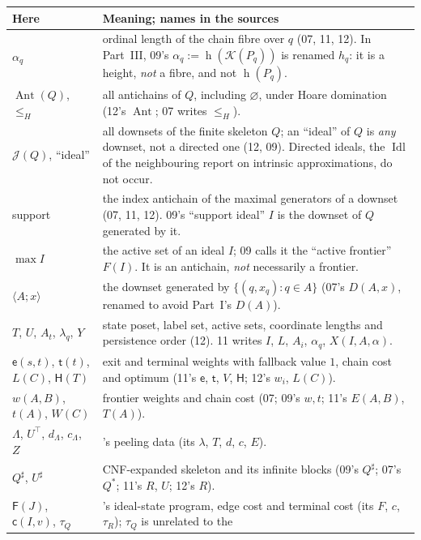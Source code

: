 \documentclass[11pt,a4paper]{article}
\theoremstyle{definition}
\theoremstyle{remark}
\newcommand{\K}{\mathcal K}
\newcommand{\hgt}{\operatorname{h}}
\newcommand{\J}{\mathcal J}
\newcommand{\Ant}{\operatorname{Ant}}
\newcommand{\ew}{\mathsf e}
\newcommand{\tw}{\mathsf t}
\newcommand{\HH}{\mathsf H}
\newcommand{\Fdp}{\mathsf F}
\begin{document}
\begin{table}[htbp]
\centering\small
\renewcommand{\arraystretch}{1.16}
\begin{tabularx}{\linewidth}{@{}>{\raggedright\arraybackslash}p{.27\linewidth}>{\raggedright\arraybackslash}X@{}}
\toprule
Here & Meaning; names in the sources\\
\midrule
$\alpha_q$ & ordinal length of the chain fibre over $q$ (07, 11, 12).
In Part~III, 09's $\alpha_q:=\hgt(\K(P_q))$ is renamed $h_q$: it is a
height, \emph{not} a fibre, and not $\hgt(P_q)$.\\
$\Ant(Q)$, $\le_H$ & all antichains of $Q$, including $\varnothing$, under
Hoare domination (12's $\Ant$; 07 writes $\le_{\!H}$).\\
$\J(Q)$, ``ideal'' & all downsets of the finite skeleton $Q$; an ``ideal''
of $Q$ is \emph{any} downset, not a directed one (12, 09). Directed ideals,
the $\operatorname{Idl}$ of the neighbouring report on intrinsic
approximations, do not occur.\\
support & the index antichain of the maximal generators of a downset (07,
11, 12). 09's ``support ideal'' $I$ is the downset of $Q$ generated by it.\\
$\max I$ & the active set of an ideal $I$; 09 calls it the ``active
frontier'' $F(I)$. It is an antichain, \emph{not} necessarily a frontier.\\
$\langle A;x\rangle$ & the downset generated by $\{(q,x_q):q\in A\}$ (07's
$D(A,x)$, renamed to avoid Part~I's $D(A)$).\\
$T$, $U$, $A_t$, $\lambda_q$, $Y$ & state poset, label set, active sets,
coordinate lengths and persistence order (12). 11 writes $I$, $L$, $A_i$,
$\alpha_q$, $X(I,A,\alpha)$.\\
$\ew(s,t)$, $\tw(t)$, $L(C)$, $\HH(T)$ & exit and terminal weights with
fallback value $1$, chain cost and optimum (11's $\mathsf e$, $\mathsf t$,
$V$, $\HH$; 12's $w_i$, $L(C)$).\\
$w(A,B)$, $t(A)$, $W(C)$ & frontier weights and chain cost (07; 09's $w,t$;
11's $E(A,B)$, $T(A)$).\\
$\Lambda$, $U^{\top}$, $d_\Lambda$, $c_\Lambda$, $Z$ & 11's peeling data
(its $\lambda$, $T$, $d$, $c$, $E$).\\
$Q^\sharp$, $U^\sharp$ & CNF-expanded skeleton and its infinite blocks (09's
$Q^\sharp$; 07's $Q^*$; 11's $R$, $U$; 12's $R$).\\
$\Fdp(J)$, $\mathsf c(I,v)$, $\tau_Q$ & 12's ideal-state program, edge cost
and terminal cost (its $F$, $c$, $\tau_R$); $\tau_Q$ is unrelated to the

\end{tabularx}
\end{table}
\end{document}
